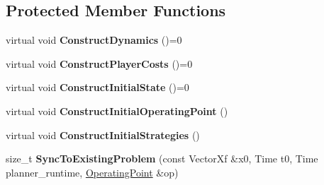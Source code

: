 \subsection*{Protected Member Functions}
\begin{DoxyCompactItemize}
\item 
virtual void {\bfseries Construct\+Dynamics} ()=0\hypertarget{classilqgames_1_1_problem_ab0ca7613920421b268d9ffed3b3d3ab5}{}\label{classilqgames_1_1_problem_ab0ca7613920421b268d9ffed3b3d3ab5}

\item 
virtual void {\bfseries Construct\+Player\+Costs} ()=0\hypertarget{classilqgames_1_1_problem_a99928ca641fc5da4ec8da3c97e2566b3}{}\label{classilqgames_1_1_problem_a99928ca641fc5da4ec8da3c97e2566b3}

\item 
virtual void {\bfseries Construct\+Initial\+State} ()=0\hypertarget{classilqgames_1_1_problem_a7033af07315f39ee66ad71a611623b2a}{}\label{classilqgames_1_1_problem_a7033af07315f39ee66ad71a611623b2a}

\item 
virtual void {\bfseries Construct\+Initial\+Operating\+Point} ()\hypertarget{classilqgames_1_1_problem_aa2a59f31887f04eaa0afa7c0d18d44ef}{}\label{classilqgames_1_1_problem_aa2a59f31887f04eaa0afa7c0d18d44ef}

\item 
virtual void {\bfseries Construct\+Initial\+Strategies} ()\hypertarget{classilqgames_1_1_problem_a0d78249b23daf89821cf02b18263ff38}{}\label{classilqgames_1_1_problem_a0d78249b23daf89821cf02b18263ff38}

\item 
size\+\_\+t {\bfseries Sync\+To\+Existing\+Problem} (const Vector\+Xf \&x0, Time t0, Time planner\+\_\+runtime, \hyperlink{structilqgames_1_1_operating_point}{Operating\+Point} \&op)\hypertarget{classilqgames_1_1_problem_ae7f62429b51816a8221603f314ce46c8}{}\label{classilqgames_1_1_problem_ae7f62429b51816a8221603f314ce46c8}

\end{DoxyCompactItemize}
